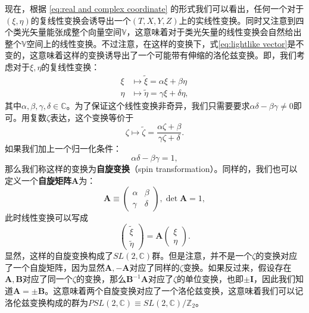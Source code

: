 现在，根据 \ref{eq:real and complex coordinate} 的形式我们可以看出，任何一个对于$( \xi ,\eta )$的复线性变换会诱导出一个$( T,X,Y,Z)$上的实线性变换。同时又注意到四个类光矢量能张成整个向量空间$\mathbb{V}$，这意味着对于类光矢量的线性变换会自然给出整个$\mathbb{V}$空间上的线性变换。不过注意，在这样的变换下，式\ref{eq:lightlike vector}是不变的，这意味着这样的变换诱导出了一个可能带有伸缩的洛伦兹变换。即，我们考虑对于$\xi ,\eta $的复线性变换：
\begin{equation*}
	\begin{aligned}
		\xi  & \mapsto \tilde{\xi } =\alpha \xi +\beta \eta \\
		\eta  & \mapsto \tilde{\eta } =\gamma \xi +\delta \eta ,
	\end{aligned}
\end{equation*}
其中$\alpha ,\beta ,\gamma ,\delta \in \mathbb{C}$。为了保证这个线性变换非奇异，我们只需要要求$\alpha \delta -\beta \gamma \neq 0$即可。用复数$\zeta $表达，这个变换等价于
\begin{equation*}
	\zeta \mapsto \tilde{\zeta } =\frac{\alpha \zeta +\beta }{\gamma \zeta +\delta } .
\end{equation*}
如果我们加上一个归一化条件：
\begin{equation*}
	\alpha \delta -\beta \gamma =1,
\end{equation*}
那么我们称这样的变换为\textbf{自旋变换}（spin transformation）。同样的，我们也可以定义一个\textbf{自旋矩阵}$\boldsymbol{A}$为：
\begin{equation*}
	\boldsymbol{A} \equiv \begin{pmatrix}
		\alpha  & \beta \\
		\gamma  & \delta 
	\end{pmatrix} ,\det\boldsymbol{A} =1,
\end{equation*}
此时线性变换可以写成
\begin{equation*}
	\begin{pmatrix}
		\tilde{\xi }\\
		\tilde{\eta }
	\end{pmatrix} =\boldsymbol{A}\begin{pmatrix}
		\xi \\
		\eta 
	\end{pmatrix} .
\end{equation*}
显然，这样的自旋变换构成了$SL( 2,\mathbb{C})$群。但是注意，并不是一个$\zeta $的变换对应了一个自旋矩阵，因为显然$\boldsymbol{A} ,-\boldsymbol{A}$对应了同样的$\zeta $变换。如果反过来，假设存在$\boldsymbol{A} ,\boldsymbol{B}$对应了同一个$\zeta $的变换，那么$\boldsymbol{B}^{-1}\boldsymbol{A}$对应了$\zeta $的单位变换，也即$\pm \boldsymbol{I}$，因此我们知道$\boldsymbol{A} =\pm \boldsymbol{B}$。这意味着两个自旋变换对应了一个洛伦兹变换，这意味着我们可以记洛伦兹变换构成的群为$PSL( 2,\mathbb{C}) \equiv SL( 2,\mathbb{C}) /\mathbb{Z}_{2}$。



